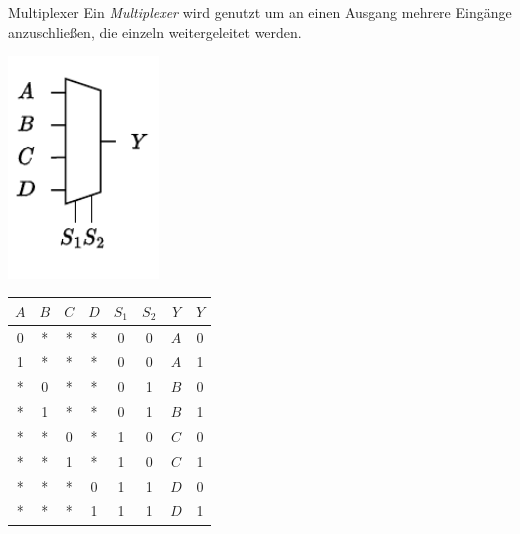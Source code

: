 \begin{defi}{Multiplexer}
    Ein \emph{Multiplexer} wird genutzt um an einen Ausgang mehrere Eingänge anzuschließen, die einzeln weitergeleitet werden.

    \begin{minipage}{0.5\textwidth}
        \begin{center}
            \includegraphics[width=0.3\textwidth]{includes/figures/defi_multiplexer.pdf}
        \end{center}
    \end{minipage}
    \begin{minipage}{0.5\textwidth}
        \begin{center}
            \begin{tabular}{|c|c|c|c|c|c||c|c|}
                \hline
                $A$ & $B$ & $C$ & $D$ & $S_1$ & $S_2$ & $Y$ & $Y$ \\\hline\hline
                0   & *   & *   & *   & 0     & 0     & $A$ & 0   \\\hline
                1   & *   & *   & *   & 0     & 0     & $A$ & 1   \\\hline
                *   & 0   & *   & *   & 0     & 1     & $B$ & 0   \\\hline
                *   & 1   & *   & *   & 0     & 1     & $B$ & 1   \\\hline
                *   & *   & 0   & *   & 1     & 0     & $C$ & 0   \\\hline
                *   & *   & 1   & *   & 1     & 0     & $C$ & 1   \\\hline
                *   & *   & *   & 0   & 1     & 1     & $D$ & 0   \\\hline
                *   & *   & *   & 1   & 1     & 1     & $D$ & 1   \\\hline
            \end{tabular}
        \end{center}
    \end{minipage}
\end{defi}

